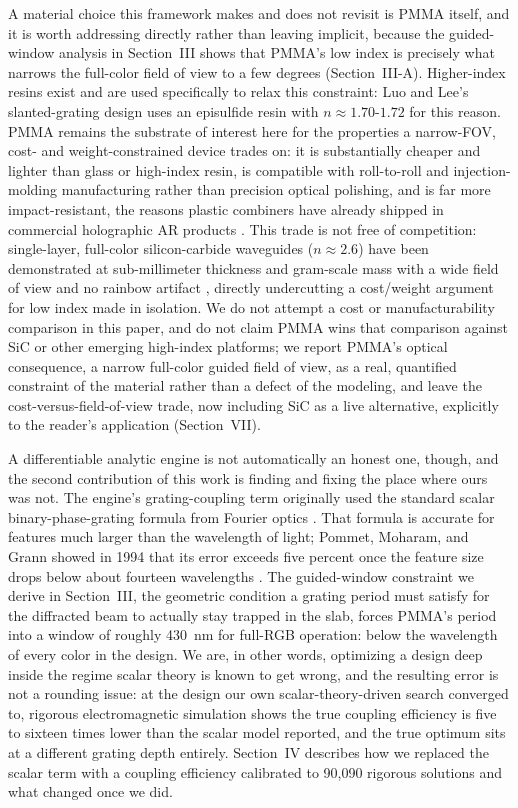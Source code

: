 \documentclass[10pt,twocolumn]{article}
\begin{document}
A material choice this framework makes and does not revisit is PMMA
itself, and it is worth addressing directly rather than leaving implicit,
because the guided-window analysis in Section~III shows that PMMA's low
index is precisely what narrows the full-color field of view to a few
degrees (Section~III-A). Higher-index resins exist and are used
specifically to relax this constraint: Luo and Lee's slanted-grating design
\cite{luo2024} uses an episulfide resin with $n\approx1.70$-$1.72$ for this
reason. PMMA remains the substrate of interest here for the properties a
narrow-FOV, cost- and weight-constrained device trades on: it is
substantially cheaper and lighter than glass or high-index resin, is
compatible with roll-to-roll and injection-molding manufacturing rather
than precision optical polishing, and is far more impact-resistant, the
reasons plastic combiners have already shipped in commercial holographic
AR products \cite{yoshida2018}. This trade is not free of competition:
single-layer, full-color silicon-carbide waveguides ($n\approx2.6$) have
been demonstrated at sub-millimeter thickness and gram-scale mass with a
wide field of view and no rainbow artifact \cite{chen2025sic}, directly
undercutting a cost/weight argument for low index made in isolation. We
do not attempt a cost or manufacturability comparison in this paper, and
do not claim PMMA wins that comparison against SiC or other emerging
high-index platforms; we report PMMA's optical consequence, a narrow
full-color guided field of view, as a real, quantified constraint of the
material rather than a defect of the modeling, and leave the
cost-versus-field-of-view trade, now including SiC as a live alternative,
explicitly to the reader's application (Section~VII).

A differentiable analytic engine is not automatically an honest one,
though, and the second contribution of this work is finding and fixing the
place where ours was not. The engine's grating-coupling term originally
used the standard scalar binary-phase-grating formula from Fourier optics
\cite{goodman}. That formula is accurate for features much larger than the
wavelength of light; Pommet, Moharam, and Grann showed in 1994 that its
error exceeds five percent once the feature size drops below about
fourteen wavelengths \cite{pommet1994}. The guided-window constraint we
derive in Section~III, the geometric condition a grating
period must satisfy for the diffracted beam to actually stay trapped in
the slab, forces PMMA's period into a window of roughly
430~nm for full-RGB operation: below the wavelength of every
color in the design. We are, in other words, optimizing a design deep
inside the regime scalar theory is known to get wrong, and the resulting
error is not a rounding issue: at the design our own scalar-theory-driven
search converged to, rigorous electromagnetic simulation shows the true
coupling efficiency is five to sixteen times lower than the scalar model
reported, and the true optimum sits at a different grating depth entirely.
Section~IV describes how we replaced the scalar term with a coupling
efficiency calibrated to 90,090 rigorous solutions and what changed once we
did.
\end{document}
